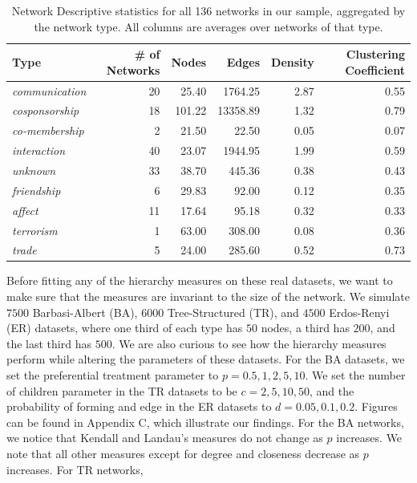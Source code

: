 \documentclass[3p,times]{elsarticle}
\begin{document}
\begin{table}[ht]
\centering
\caption{\label{tab:descriptive stats by type} Network Descriptive statistics for all 136 networks in our sample, aggregated by the network type. All columns are averages over networks of that type.}
\begin{tabular}{lrrrrr}
  \toprule
 \textbf{Type} & \textbf{\# of Networks} & \textbf{Nodes} & \textbf{Edges} & \textbf{Density} & \textbf{Clustering Coefficient} \\ 
  \midrule
\emph{communication} & 20 & 25.40 & 1764.25 & 2.87 & 0.55 \\ 
  \emph{cosponsorship} & 18 & 101.22 & 13358.89 & 1.32 & 0.79 \\ 
  \emph{co-membership} & 2 & 21.50 & 22.50 & 0.05 & 0.07 \\ 
  \emph{interaction} & 40 & 23.07 & 1944.95 & 1.99 & 0.59 \\ 
  \emph{unknown} & 33 & 38.70 & 445.36 & 0.38 & 0.43 \\ 
  \emph{friendship} & 6 & 29.83 & 92.00 & 0.12 & 0.35 \\ 
  \emph{affect} & 11 & 17.64 & 95.18 & 0.32 & 0.33 \\ 
  \emph{terrorism} & 1 & 63.00 & 308.00 & 0.08 & 0.36 \\ 
  \emph{trade} & 5 & 24.00 & 285.60 & 0.52 & 0.73 \\ 
   \bottomrule
\end{tabular}
\end{table}

Before fitting any of the hierarchy measures on these real datasets, we want to make sure that the measures are invariant to the size of the network. We simulate $7500$ Barbasi-Albert (BA), $6000$ Tree-Structured (TR), and $4500$ Erdos-Renyi (ER) datasets, where one third of each type has $50$ nodes, a third has $200$, and the last third has $500$. We are also curious to see how the hierarchy measures perform while altering the parameters of these datasets. For the BA datasets, we set the preferential treatment parameter to $p=0.5, 1, 2, 5, 10$. We set the number of children parameter in the TR datasets to be $c=2, 5, 10, 50$, and the probability of forming and edge in the ER datasets to $d=0.05, 0.1, 0.2$. Figures can be found in Appendix C, which illustrate our findings. For the BA networks, we notice that Kendall and Landau's measures do not change as $p$ increases. We note that all other measures except for degree and closeness decrease as $p$ increases. For TR networks,   
	
\end{document}
